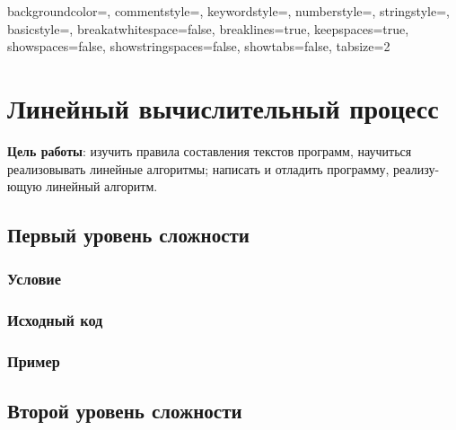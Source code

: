 
\usepackage{listings}
\usepackage{xcolor}


 {
    backgroundcolor=\color{backcolour}, commentstyle=\color{codegreen},
    keywordstyle=\color{codeblue},
    numberstyle=\tiny\color{codegray},
    stringstyle=\color{codeblue},
    basicstyle=\ttfamily\footnotesize,
    breakatwhitespace=false,         
    breaklines=true,                   
    keepspaces=true,             
    showspaces=false,                
    showstringspaces=false,
    showtabs=false,                  
    tabsize=2
}

\lstset{style=mystyle}





\section{Линейный вычислительный процесс}

\textbf{Цель работы}: изучить правила составления текстов программ, научиться
реализовывать линейные алгоритмы; написать и отладить программу, реализу-
ющую линейный алгоритм.

\subsection{Первый уровень сложности}

\subsubsection{Условие}



\subsubsection{Исходный код}


\subsubsection{Пример}


\subsection{Второй уровень сложности}

